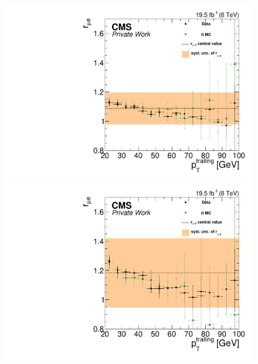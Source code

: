 \begin{figure}[htbp]
\centering
\begin{minipage}[t]{0.49\textwidth}
  \includegraphics[width=\textwidth]{plots/BG/rmue/rMuE_ZPeakControlCentral_Full2012_TrailingPt_leadingPt30.pdf}
\end{minipage}
\begin{minipage}[t]{0.49\textwidth}
\includegraphics[width=\textwidth]{plots/BG/rmue/rMuE_ZPeakControlForward_Full2012_TrailingPt_leadingPt30.pdf}
\end{minipage}
\begin{minipage}[t]{0.49\textwidth}

\end{minipage}
\end{figure}
